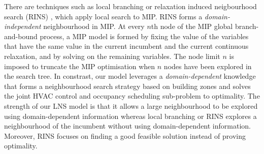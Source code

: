 There are techniques such as local branching or relaxation induced neigbourhood search (RINS) \citep{danna2005exploring,danna2003structured}, which apply local search to MIP. RINS forms a \textsl{domain-independent} neighbourhood in MIP. At every $n$th node of the MIP global branch-and-bound process, a MIP model is formed by fixing the value of the variables that have the same value in the current incumbent and the current continuous relaxation, and by solving on the remaining variables. The node limit $n$ is imposed to truncate the MIP optimisation when $n$ nodes have been explored in the search tree. 
In constrast, our model leverages a \textsl{domain-dependent} knowledge that forms a neighbourhood search strategy based on building zones and solves the joint HVAC control and occupancy scheduling sub-problem to optimality. The strength of our LNS model is that it allows a large neighbourhood to be explored using domain-dependent information whereas local branching or RINS explores a neighbourhood of the incumbent without using domain-dependent information. Moreover, RINS focuses on finding a good feasible solution instead of proving optimality. 

